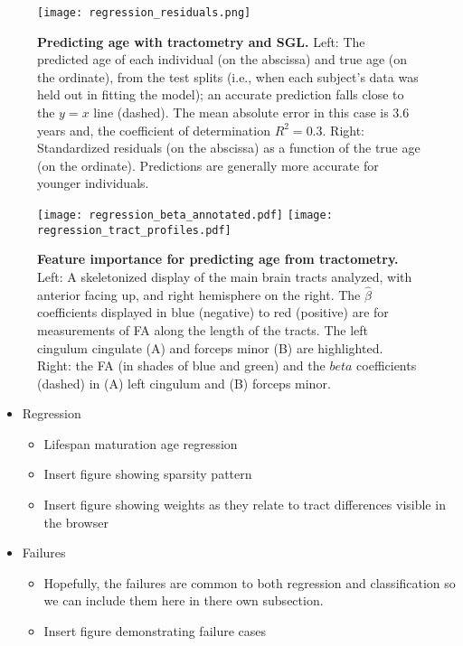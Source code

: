 \begin{figure}[!h]
    \centering
    \texttt{[image: regression\_residuals.png]}
    \caption{{\bf Predicting age with tractometry and SGL.} Left: The predicted age of each individual (on the abscissa) and true age (on the ordinate), from the test splits (i.e., when each subject's data was held out in fitting the model); an accurate prediction falls close to the $y=x$ line (dashed). The mean absolute error in this case is 3.6 years and, the coefficient of determination $R^2=0.3$. Right: Standardized residuals (on the abscissa) as a function of the true age (on the ordinate). Predictions are generally more accurate for younger individuals.
    }
    \label{fig:regress-results}
\end{figure}

\begin{figure}[!h]
    \centering
    \texttt{[image: regression\_beta\_annotated.pdf]}
    \texttt{[image: regression\_tract\_profiles.pdf]}
    \caption{{\bf Feature importance for predicting age from tractometry.} Left: A skeletonized display of the main brain tracts analyzed, with anterior facing up, and right hemisphere on the right. The $\hat{\beta}$ coefficients displayed in blue (negative) to red (positive) are for measurements of FA along the length of the tracts. The left cingulum cingulate (A) and forceps minor (B) are highlighted. Right: the FA (in shades of blue and green) and the $beta$ coefficients (dashed) in (A) left cingulum and (B) forceps minor.
    }
    \label{fig:regress-beta}
\end{figure}


\begin{itemize}
  \item Regression
    \begin{itemize}
      \item Lifespan maturation age regression
      \item Insert figure showing sparsity pattern
      \item Insert figure showing weights as they relate to tract differences visible in the browser
    \end{itemize}
\end{itemize}
\begin{itemize}
  \item Failures
    \begin{itemize}
      \item Hopefully, the failures are common to both regression
        and classification so we can include them here in there own
        subsection.
      \item Insert figure demonstrating failure cases
    \end{itemize}
\end{itemize}

